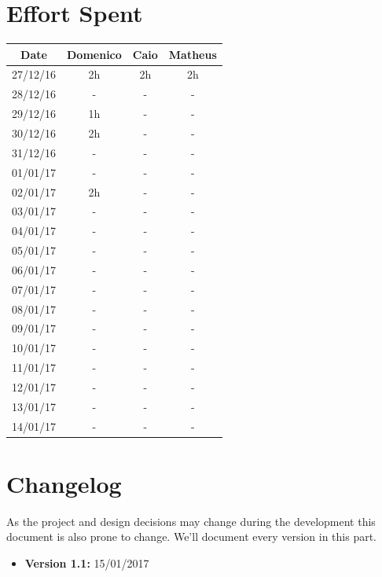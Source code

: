 \documentclass[a4paper]{article}
\begin{document}
\section{Effort Spent}
\begin{tabular}{ | c | c | c | c | }
\hline
	\textbf {Date} & \textbf {Domenico} & \textbf {Caio} & \textbf {Matheus} \\ \hline
	27/12/16& 2h & 2h & 2h  \\ \hline
	28/12/16& - & - & - \\ \hline
	29/12/16& 1h & - & - \\ \hline
	30/12/16& 2h & - & - \\ \hline
	31/12/16& - & - & - \\ \hline
	01/01/17& - & - & - \\ \hline
	02/01/17& 2h & - & - \\ \hline
	03/01/17& - & - & - \\ \hline
	04/01/17& - & - & - \\ \hline
	05/01/17& - & - & - \\ \hline
	06/01/17& - & - & - \\ \hline
	07/01/17& - & - & - \\ \hline
	08/01/17& - & - & - \\ \hline
	09/01/17& - & - & - \\ \hline
	10/01/17& - & - & - \\ \hline
	11/01/17& - & - & - \\ \hline
	12/01/17& - & - & - \\ \hline
	13/01/17& - & - & - \\ \hline
	14/01/17& - & - & - \\ \hline
\end{tabular}
\newpage

\section{Changelog}
As the project and design decisions may change during the development this document is also prone to change.
We'll document every version in this part.
\begin{itemize}
\item \textbf {Version 1.1:} 15/01/2017
\end{itemize}
\end{document}
